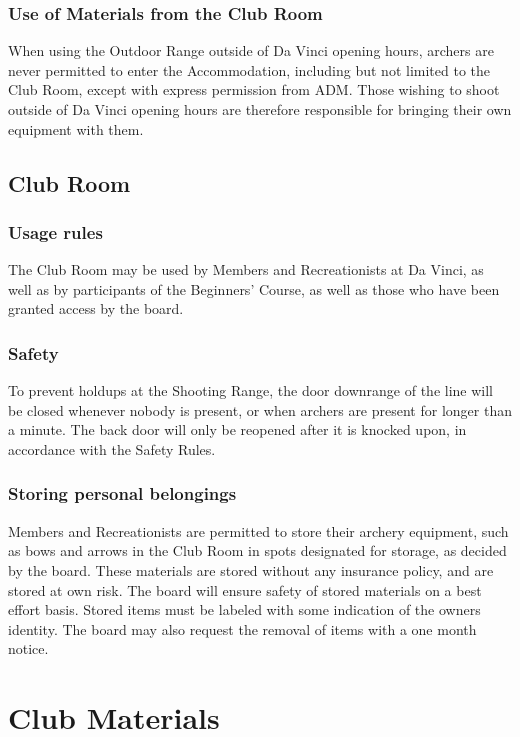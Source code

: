 \documentclass[a4paper]{article}
\newcommand{\Asr}{Safety Rules} %
\begin{document}
\subsubsection{Use of Materials from the Club Room}
When using the Outdoor Range outside of Da Vinci opening hours, { archers} are never permitted to enter the { Accommodation}, including but not limited to the { Club Room}, except with express permission from { ADM}. Those wishing to shoot outside of Da Vinci opening hours are therefore responsible for bringing their own equipment with them.

\subsection{Club Room}
\subsubsection{Usage rules}
The { Club Room} may be used by { Members} and { Recreationists} at Da Vinci, as well as by participants of the { Beginners' Course}, as well as those who have been granted access by the board. 

\subsubsection{Safety}
To prevent holdups at the Shooting Range, the door { downrange of the line} will be closed whenever nobody is present, or when { archers} are present for longer than a minute. The back door will only be reopened after it is knocked upon, in accordance with the { \Asr}.

\subsubsection{Storing personal belongings}
{ Members} and { Recreationists} are permitted to store their archery equipment, such as bows and arrows in the { Club Room} in spots designated for storage, as decided by the board. These materials are stored without any insurance policy, and are stored at own risk. The board will ensure safety of stored materials on a best effort basis. Stored items must be labeled with some indication of the owners identity. The board may also request the removal of items with a one month notice.

\section{Club Materials}
\end{document}

